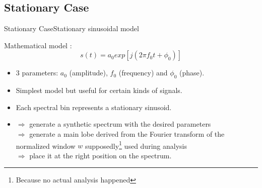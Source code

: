\documentclass{bredelebeamer}
\begin{document}
\subsection{Stationary Case}
\begin{frame}{Stationary Case}{Stationary sinusoidal model}
\begin{block}{}
Mathematical model : \\

\begin{equation}
s(t) = a_0 exp[j(2 \pi f_0 t + \phi_0)]
\end{equation}
\end{block}
\begin{itemize}
\item 3 parameters: $a_0$ (amplitude), $f_0$ (frequency) and $\phi_0$ (phase).
\item Simplest model but useful for certain kinds of signals.
\item Each spectral bin represents a stationary sinusoid.
\item $\Rightarrow$ generate a synthetic spectrum with the desired parameters\\ $\Rightarrow$ generate a main lobe derived from the Fourier transform of the normalized window $w$ supposedly\footnote{Because no actual analysis happened} used during analysis \\ $\Rightarrow$ place it at the right position on the spectrum.
\end{itemize}

\end{frame}
\end{document}
